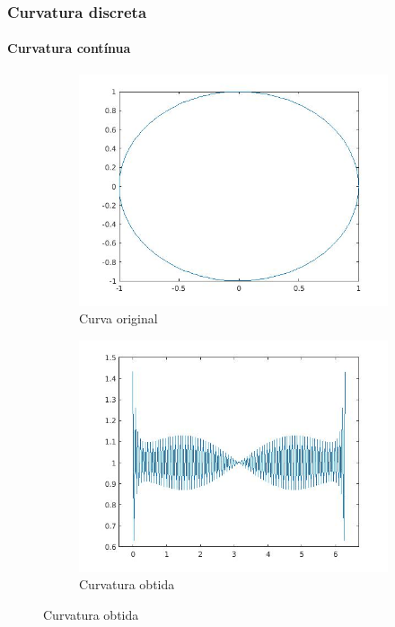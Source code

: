 \begin{frame}
\frametitle{Curvatura discreta}
\framesubtitle{Curvatura contínua}

\begin{center}
\begin{figure}
	\centering
	\begin{subfigure}[b]{0.49\textwidth}
		\centering
		\includegraphics[width=\textwidth]{img/curva_original.jpg}
		\caption{Curva original}
		\label{fig:edic}
	\end{subfigure}
	\hfill
	\begin{subfigure}[b]{0.49\textwidth}
		\centering
		\includegraphics[width=\textwidth]{img/curvatura_calc.jpg}
		\caption{Curvatura obtida}
		\label{fig:interp}
	\end{subfigure}
\end{figure}
\end{center}

\end{frame}


